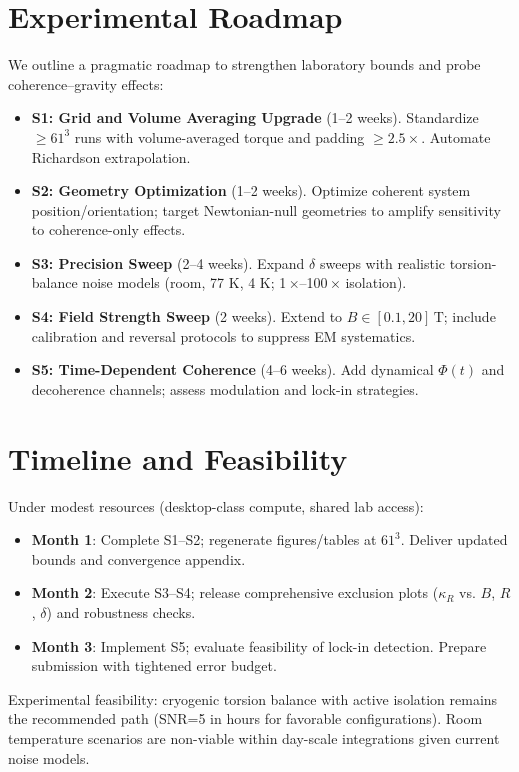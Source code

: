 \documentclass[10pt,twocolumn]{article}
\begin{document}
\section{Experimental Roadmap}
We outline a pragmatic roadmap to strengthen laboratory bounds and probe coherence--gravity effects:
\begin{itemize}
  \item \textbf{S1: Grid and Volume Averaging Upgrade} (1--2 weeks). Standardize \(\ge 61^3\) runs with volume-averaged torque and padding $\ge 2.5\times$. Automate Richardson extrapolation.
  \item \textbf{S2: Geometry Optimization} (1--2 weeks). Optimize coherent system position/orientation; target Newtonian-null geometries to amplify sensitivity to coherence-only effects.
  \item \textbf{S3: Precision Sweep} (2--4 weeks). Expand $\delta$ sweeps with realistic torsion-balance noise models (room, 77 K, 4 K; 1\,$\times$--100\,$\times$ isolation).
  \item \textbf{S4: Field Strength Sweep} (2 weeks). Extend to \(B\in[0.1,20]\,\mathrm{T}\); include calibration and reversal protocols to suppress EM systematics.
  \item \textbf{S5: Time-Dependent Coherence} (4--6 weeks). Add dynamical $\Phi(t)$ and decoherence channels; assess modulation and lock-in strategies.
\end{itemize}

\section{Timeline and Feasibility}
Under modest resources (desktop-class compute, shared lab access):
\begin{itemize}
  \item \textbf{Month 1}: Complete S1--S2; regenerate figures/tables at \(61^3\). Deliver updated bounds and convergence appendix.
  \item \textbf{Month 2}: Execute S3--S4; release comprehensive exclusion plots (\(\kappa_R\) vs. $B$, $R$, $\delta$) and robustness checks.
  \item \textbf{Month 3}: Implement S5; evaluate feasibility of lock-in detection. Prepare submission with tightened error budget.
\end{itemize}
Experimental feasibility: cryogenic torsion balance with active isolation remains the recommended path (SNR=5 in hours for favorable configurations). Room temperature scenarios are non-viable within day-scale integrations given current noise models.
\end{document}
